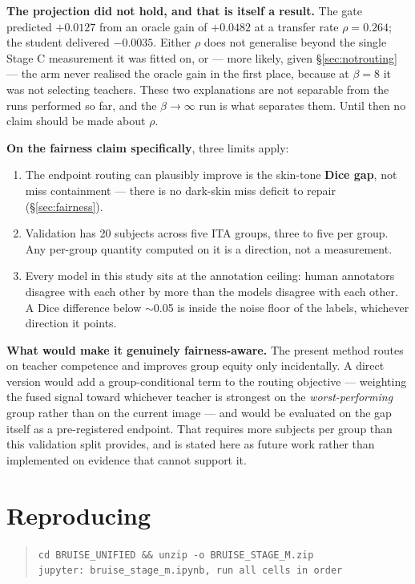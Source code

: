 \documentclass[11pt,a4paper]{article}
\begin{document}
\textbf{The projection did not hold, and that is itself a result.} The gate
predicted $+0.0127$ from an oracle gain of $+0.0482$ at a transfer rate
$\rho = 0.264$; the student delivered $-0.0035$. Either $\rho$ does not
generalise beyond the single Stage C measurement it was fitted on, or --- more
likely, given \S\ref{sec:notrouting} --- the arm never realised the oracle gain
in the first place, because at $\beta = 8$ it was not selecting teachers. These
two explanations are not separable from the runs performed so far, and the
$\beta \to \infty$ run is what separates them. Until then no claim should be made
about $\rho$.

\textbf{On the fairness claim specifically}, three limits apply:

\begin{enumerate}\itemsep2pt
\item The endpoint routing can plausibly improve is the skin-tone \textbf{Dice
gap}, not miss containment --- there is no dark-skin miss deficit to repair
(\S\ref{sec:fairness}).
\item Validation has 20 subjects across five ITA groups, three to five per group.
Any per-group quantity computed on it is a direction, not a measurement.
\item Every model in this study sits at the annotation ceiling: human annotators
disagree with each other by more than the models disagree with each other. A Dice
difference below $\sim$0.05 is inside the noise floor of the labels, whichever
direction it points.
\end{enumerate}

\textbf{What would make it genuinely fairness-aware.} The present method routes on
teacher competence and improves group equity only incidentally. A direct version
would add a group-conditional term to the routing objective --- weighting the
fused signal toward whichever teacher is strongest on the \emph{worst-performing}
group rather than on the current image --- and would be evaluated on the gap
itself as a pre-registered endpoint. That requires more subjects per group than
this validation split provides, and is stated here as future work rather than
implemented on evidence that cannot support it.

\section*{Reproducing}

\begin{quote}\small
\texttt{cd BRUISE\_UNIFIED \&\& unzip -o BRUISE\_STAGE\_M.zip}\\
\texttt{jupyter: bruise\_stage\_m.ipynb, run all cells in order}
\end{quote}
\end{document}
